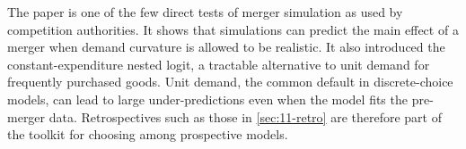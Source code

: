  The paper is one of the few direct tests of merger simulation as used by competition
authorities. It shows that simulations can predict the main effect of a merger when demand curvature is allowed to
be realistic. It also introduced the constant-expenditure nested logit, a tractable alternative to unit demand for
frequently purchased goods. Unit demand, the common default in discrete-choice models, can lead to large under-predictions even
when the model fits the pre-merger data. Retrospectives such as those in \cref{sec:11-retro} are therefore part of
the toolkit for choosing among prospective models.
